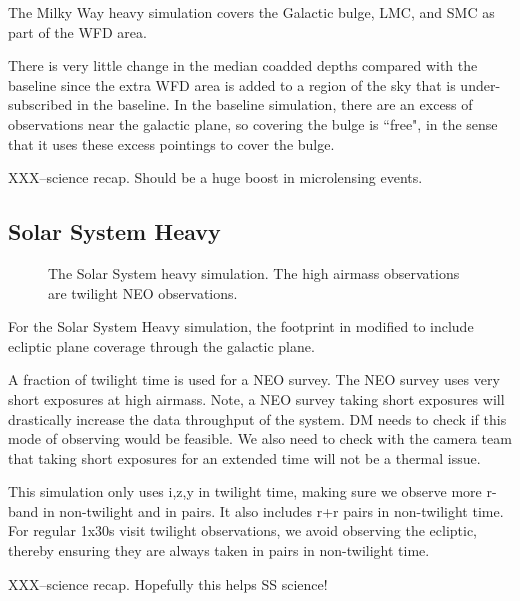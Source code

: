 The Milky Way heavy simulation covers the Galactic bulge, LMC, and SMC as part of the WFD area.  

There is very little change in the median coadded depths compared with the baseline since the extra WFD area is added to a region of the sky that is under-subscribed in the baseline.  In the baseline simulation, there are an excess of observations near the galactic plane, so covering the bulge is ``free", in the sense that it uses these excess pointings to cover the bulge.

XXX--science recap. Should be a huge boost in microlensing events. 

\subsection{Solar System Heavy}
\begin{figure}
\caption{The Solar System heavy simulation. The high airmass observations are twilight NEO observations.}\label{fig:ssheavy}
\end{figure}

For the Solar System Heavy simulation, the footprint in modified to include ecliptic plane coverage through the galactic plane.

A fraction of twilight time is used for a NEO survey. The NEO survey uses very short exposures at high airmass. Note, a NEO survey taking short exposures will drastically increase the data throughput of the system. DM needs to check if this mode of observing would be feasible.  We also need to check with the camera team that taking short exposures for an extended time will not be a thermal issue.

This simulation only uses i,z,y in twilight time, making sure we observe more r-band in non-twilight and in pairs. It also includes r+r pairs in non-twilight time.  For regular 1x30s visit twilight observations, we avoid observing the ecliptic, thereby ensuring they are always taken in pairs in non-twilight time.

XXX--science recap. Hopefully this helps SS science!

